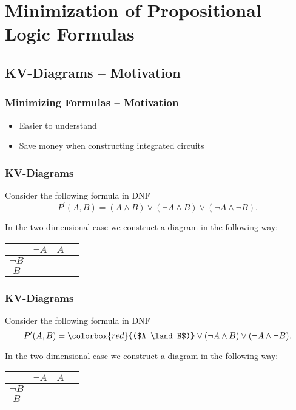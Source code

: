 \documentclass{beamer}
\theoremstyle{remark}
\begin{document}
\section{Minimization of Propositional Logic Formulas}
\subsection{KV-Diagrams -- Motivation}
\begin{frame}

	\frametitle{Minimizing Formulas -- Motivation}
	
	\begin{itemize}
		\item Easier to understand
		\item Save money when constructing integrated circuits
	\end{itemize}
\end{frame}

\begin{frame}
	\frametitle{KV-Diagrams}
	Consider the following formula in DNF
	\[ P^{\prime}(A, B) = (A \land B) \lor (\lnot A \land B) \lor (\lnot A \land \lnot B).\]
	
	In the two dimensional case we construct a diagram in the following way:
	
	\vspace{1.5em}
	
	\begin{center}
	\begin{tabular}{c|c|c|c}
		& $\lnot A$ & $A$ \\ \hline
		$\lnot B$ & &  \\ \hline
		$B$ & &   \\ \hline
	\end{tabular}
	\end{center}
\end{frame}

\begin{frame}
	\frametitle{KV-Diagrams}
	Consider the following formula in DNF
	\[ P^{\prime}(A, B) = \colorbox{red}{($A \land B$)} \lor (\lnot A \land B) \lor (\lnot A \land \lnot B).\]
	
	In the two dimensional case we construct a diagram in the following way:
	
	\vspace{1.5em}
	
	\begin{center}
	\begin{tabular}{c|c|c|c}
		& $\lnot A$ & $A$ \\ \hline
		$\lnot B$ & &  \\ \hline
		$B$ & &  \\ \hline
	\end{tabular}
	\end{center}
\end{frame}
\end{document}
